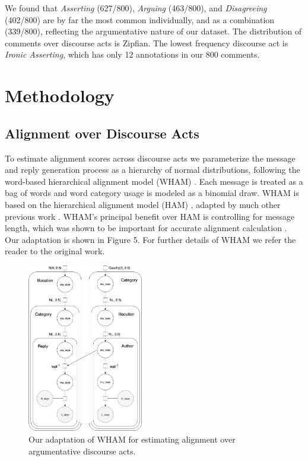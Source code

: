 \documentclass[11pt,a4paper]{article}
\begin{document}
We found that \textit{Asserting} (627/800), \textit{Arguing} (463/800), and \textit{Disagreeing} (402/800) are by far the most common individually, and as a combination (339/800), reflecting the argumentative nature of our dataset. The distribution of comments over discourse acts is Zipfian. The lowest frequency discourse act is \textit{Ironic Asserting}, which has only 12 annotations in our 800 comments.

%

\section{Methodology}

\subsection{Alignment over Discourse Acts}

To estimate alignment scores across discourse acts we parameterize the message and reply generation process as a hierarchy of normal distributions, following the word-based hierarchical alignment model (WHAM) \cite{DoyleF16}. Each message is treated as a bag of words and word category usage is modeled as a binomial draw. WHAM is based on the hierarchical alignment model (HAM) \cite{DoyleYF16}, adapted by much other previous work \cite{DoyleF16, YurovskyDF16, DoyleGSF17}. WHAM's principal benefit over HAM is controlling for message length, which was shown to be important for accurate alignment calculation \cite{DoyleF16}. Our adaptation is shown in Figure 5. For further details of WHAM we refer the reader to the original work.

\begin{figure}[t]
\centering
\includegraphics[width=0.45\textwidth]{MyHAM.png}
\caption{Our adaptation of WHAM \cite{DoyleF16} for estimating alignment over argumentative discourse acts.}
\end{figure}
\end{document}
